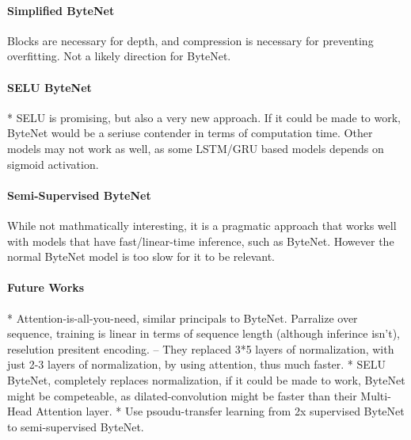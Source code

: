 \paragraph{Simplified ByteNet}
Blocks are necessary for depth, and compression is necessary for preventing overfitting. Not a likely direction for ByteNet.

\paragraph{SELU ByteNet}
* SELU is promising, but also a very new approach. If it could be made to work, ByteNet would be a seriuse contender in terms of computation time. Other models may not work as well, as some LSTM/GRU based models depends on sigmoid activation.

\paragraph{Semi-Supervised ByteNet}
While not mathmatically interesting, it is a pragmatic approach that works well with models that have fast/linear-time inference, such as ByteNet. However the normal ByteNet model is too slow for it to be relevant.

\paragraph{Future Works}
* Attention-is-all-you-need, similar principals to ByteNet. Parralize over sequence, training is linear in terms of sequence length (although inferince isn't), reselution presitent encoding. – They replaced 3*5 layers of normalization, with just 2-3 layers of normalization, by using attention, thus much faster.
* SELU ByteNet, completely replaces normalization, if it could be made to work, ByteNet might be competeable, as dilated-convolution might be faster than their Multi-Head Attention layer.
* Use psoudu-transfer learning from 2x supervised ByteNet to semi-supervised ByteNet.